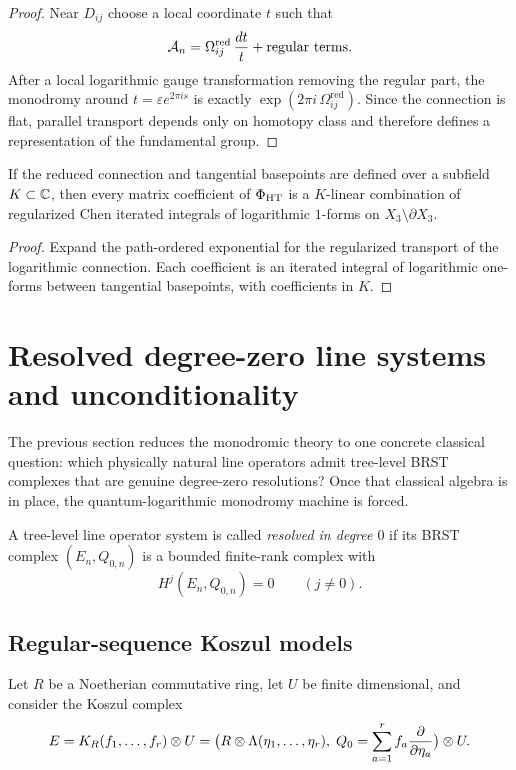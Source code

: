 \begin{proof}
Near $D_{ij}$ choose a local coordinate $t$ such that
\[
 \mathcal A_n=\Omega_{ij}^{\mathrm{red}}\,\frac{dt}{t}+\text{regular terms}.
\]
After a local logarithmic gauge transformation removing the regular part, the monodromy around $t=\varepsilon e^{2\pi is}$ is exactly $\exp(2\pi i\,\Omega_{ij}^{\mathrm{red}})$. Since the connection is flat, parallel transport depends only on homotopy class and therefore defines a representation of the fundamental group.
\end{proof}

\begin{corollary}\label{cor:periods}
If the reduced connection and tangential basepoints are defined over a subfield $K\subset\mathbb C$, then every matrix coefficient of $\Phi_{\mathrm{HT}}$ is a $K$-linear combination of regularized Chen iterated integrals of logarithmic $1$-forms on $X_3\setminus\partial X_3$.
\end{corollary}

\begin{proof}
Expand the path-ordered exponential for the regularized transport of the logarithmic connection. Each coefficient is an iterated integral of logarithmic one-forms between tangential basepoints, with coefficients in $K$.
\end{proof}

\section{Resolved degree-zero line systems and unconditionality}\label{sec:resolved}

The previous section reduces the monodromic theory to one concrete classical question: which physically natural line operators admit tree-level BRST complexes that are genuine degree-zero resolutions? Once that classical algebra is in place, the quantum-logarithmic monodromy machine is forced.

\begin{definition}\label{def:resolved-line}
A tree-level line operator system is called \emph{resolved in degree $0$} if its BRST complex $(E_n,Q_{0,n})$ is a bounded finite-rank complex with
\[
 H^j(E_n,Q_{0,n})=0 \qquad (j\neq 0).
\]
\end{definition}

\subsection{Regular-sequence Koszul models}
Let $R$ be a Noetherian commutative ring, let $U$ be finite dimensional, and consider the Koszul complex
\[
 E = K_R(f_1,\dots,f_r)\otimes U
 = \big(R\otimes \Lambda(\eta_1,\dots,\eta_r),\;Q_0=\sum_{a=1}^r f_a\frac{\partial}{\partial\eta_a}\big)\otimes U.
\]

